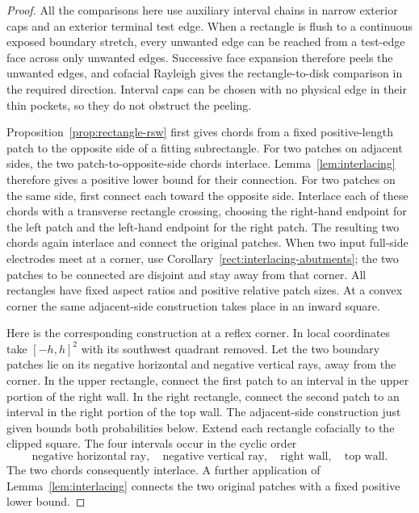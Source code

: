 \begin{proof}
All the comparisons here use auxiliary interval chains in narrow
exterior caps and an exterior terminal test edge.  When a rectangle
is flush to a continuous exposed boundary stretch, every unwanted
edge can be reached from a test-edge face across only unwanted edges.
Successive face expansion therefore peels the unwanted edges, and
cofacial Rayleigh gives the rectangle-to-disk comparison in the
required direction.  Interval caps can be chosen with no physical
edge in their thin pockets, so they do not obstruct the peeling.

Proposition~\ref{prop:rectangle-rsw} first gives chords from a fixed
positive-length patch to the opposite side of a fitting subrectangle.
For two patches on adjacent sides, the two patch-to-opposite-side
chords interlace.  Lemma~\ref{lem:interlacing} therefore gives a
positive lower bound for their connection.  For two patches on the
same side, first connect each toward the opposite side.  Interlace
each of these chords with a transverse rectangle crossing, choosing
the right-hand endpoint for the left patch and the left-hand endpoint
for the right patch.  The resulting two chords again interlace and
connect the original patches.  When two input full-side electrodes meet
at a corner, use
Corollary~\ref{rect:interlacing-abutments}; the two patches to be
connected are disjoint and stay away from that corner.  All rectangles
have fixed aspect ratios and positive relative patch sizes.  At a convex
corner the same adjacent-side construction takes place in an inward square.

Here is the corresponding construction at a reflex corner.  In local
coordinates take $[-h,h]^2$ with its southwest quadrant removed.
Let the two boundary patches lie on its negative horizontal and
negative vertical rays, away from the corner.  In the upper rectangle,
connect the first patch to an interval in the upper portion of the
right wall.  In the right rectangle, connect the second patch to an
interval in the right portion of the top wall.  The adjacent-side
construction just given bounds both probabilities below.  Extend
each rectangle cofacially to the clipped square.  The four intervals
occur in the cyclic order
\[
 \text{negative horizontal ray},\quad
 \text{negative vertical ray},\quad
 \text{right wall},\quad \text{top wall}.
\]
The two chords consequently interlace.  A further application of
Lemma~\ref{lem:interlacing} connects the two original patches with
a fixed positive lower bound.


\end{proof}
